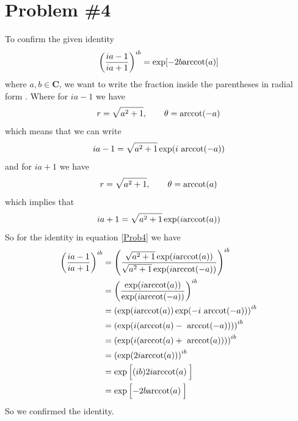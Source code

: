 \documentclass[11pt]{article}
\numberwithin{equation}{section}
\begin{document}
\section{Problem \#4}
To confirm the given identity 
\begin{equation}
\left(\frac{ia-1}{ia+1}\right)^{ib} = \exp[-2b\textnormal{arccot}(a)]
\label{Prob4}
\end{equation}
where $a,b\in\mathbf{C}$, we want to write the fraction inside the parentheses in radial form
. Where for $ia-1$ we have
$$r=\sqrt{a^2+1},\qquad \theta = \textnormal{arccot}(-a)$$
which means that we can write
$$ia-1 = \sqrt{a^2+1}\exp(i\ \textnormal{arccot}(-a))$$
and for $ia+1$ we have
$$r=\sqrt{a^2+1},\qquad \theta = \textnormal{arccot}(a)$$
which implies that
$$ia+1 = \sqrt{a^2+1}\exp(i\textnormal{arccot}(a))$$
So for the identity in equation \ref{Prob4} we have
\begin{align*}
\left(\frac{ia-1}{ia+1}\right)^{ib} &= \left(\frac{\sqrt{a^2+1}\exp(i\textnormal{arccot}(a))}{\sqrt{a^2+1}\exp(i\textnormal{arccot}(-a))}\right)^{ib} \\
&= \left(\frac{\exp(i\textnormal{arccot}(a))}{\exp(i\textnormal{arccot}(-a))}\right)^{ib} \\
&= \left(\exp(i\textnormal{arccot}(a))\exp(-i\ \textnormal{arccot}(-a))\right)^{ib} \\
&= \left(\exp(i(\textnormal{arccot}(a)-\ \textnormal{arccot}(-a)))\right)^{ib} \\
&= \left(\exp({i(\textnormal{arccot}(a)+\ \textnormal{arccot}(a))})\right)^{ib} \\
&= \left(\exp(2i\textnormal{arccot}(a))\right)^{ib} \\
&= \exp\left[(ib)2i\textnormal{arccot}(a)\frac{}{}\right]\\
&= \exp\left[-2b\textnormal{arccot}(a)\frac{}{}\right]
\end{align*}
So we confirmed the identity.
\end{document}
